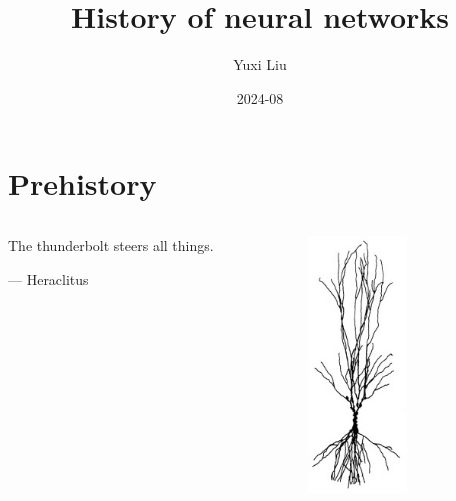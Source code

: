 \documentclass{beamer}
\title{History of neural networks}
\author{Yuxi Liu}
\institute{UC Berkeley}
\date{2024-08}
\begin{document}
\begin{frame}
\titlepage 
\end{frame}

\section{Prehistory}

\begin{frame}
\begin{columns}
\begin{column}{0.6\textwidth}
    \begin{displayquote}
    The thunderbolt steers all things.

    --- Heraclitus
    \end{displayquote}
\end{column}
\begin{column}{0.4\textwidth}
    \begin{figure}[t]
        \includegraphics[width=0.6\textwidth]{figure/neuron_thunderbolt.jpg}
        \centering
    \end{figure}
\end{column}
\end{columns}
\end{frame}
\end{document}
